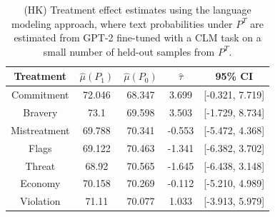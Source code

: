 \documentclass{article}
\begin{document}
\begin{table}[!ht]
    \centering
    \begin{tabular}{c|cccc}
        \toprule
        Treatment & $\hat{\mu}(P_1)$ & $\hat{\mu}(P_0)$ & $\hat{\tau}$ & 95\% CI \\
        \midrule
        Commitment & 72.046 & 68.347 & \textcolor{green!50!black}{3.699} & [-0.321, 7.719] \\
        Bravery & 73.1 & 69.598 & \textcolor{green!50!black}{3.503} & [-1.729, 8.734] \\
        Mistreatment & 69.788 & 70.341 & \textcolor{red!80!black}{-0.553} & [-5.472, 4.368] \\
        Flags & 69.122 & 70.463 & \textcolor{red!80!black}{-1.341} & [-6.382, 3.702] \\
        Threat & 68.92 & 70.565 & \textcolor{red!80!black}{-1.645} & [-6.438, 3.148] \\
        Economy & 70.158 & 70.269 & \textcolor{red!80!black}{-0.112} & [-5.210, 4.989] \\
        Violation & 71.11 & 70.077 & \textcolor{green!50!black}{1.033} & [-3.913, 5.979] \\
        \bottomrule
    \end{tabular}
    \caption{(HK) Treatment effect estimates using the language modeling approach, where text probabilities under $P^T$ are estimated from GPT-2 fine-tuned with a CLM task on a small number of held-out samples from $P^T$.}
    \label{tab:results_clm_gpt2_finetuned}
\end{table}

\end{document}
